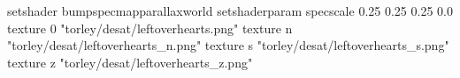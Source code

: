 setshader bumpspecmapparallaxworld
setshaderparam specscale 0.25 0.25 0.25 0.0
texture 0 "torley/desat/leftoverhearts.png"
texture n "torley/desat/leftoverhearts_n.png"
texture s "torley/desat/leftoverhearts_s.png"
texture z "torley/desat/leftoverhearts_z.png"

